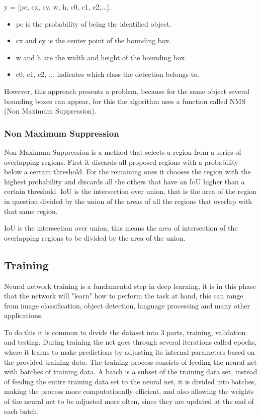 y = [pc, cx, cy, w, h, c0, c1, c2,...].

\begin{itemize}
    \item pc is the probability of being the identified object.
    \item cx and cy is the center point of the bounding box.
    \item w and h are the width and height of the bounding box.
    \item c0, c1, c2, ... indicates which class the detection belongs to.
\end{itemize}

However, this approach presents a problem, because for the same object several bounding boxes can appear, for this the algorithm uses a function called NMS (Non Maximum Suppression).

\subsubsection{Non Maximum Suppression}
Non Maximum Suppression \cite{nonmaxsurpression} is a method that selects a region from a series of overlapping regions. First it discards all proposed regions with a probability below a certain threshold. For the remaining ones it chooses the region with the highest probability and discards all the others that have an IoU higher than a certain threshold.
IoU is the intersection over union, that is the area of the region in question divided by the union of the areas of all the regions that overlap with that same region.

IoU is the intersection over union, this means the area of intersection of the overlapping regions to be divided by the area of the union.


\subsection{Training}
Neural network training is a fundamental step in deep learning, it is in this phase that the network will "learn" how to perform the task at hand, this can range from image classification, object detection, language processing and many other applications.

To do this it is common to divide the dataset into 3 parts, training, validation and testing. During training the net goes through several iterations called epochs, where it learns to make predictions by adjusting its internal parameters based on the provided training data.
The training process consists of feeding the neural net with batches of training data.
A batch is a subset of the training data set, instead of feeding the entire training data set to the neural net, it is divided into batches, making the process more computationally efficient, and also allowing the weights of the neural net to be adjusted more often, since they are updated at the end of each batch.


